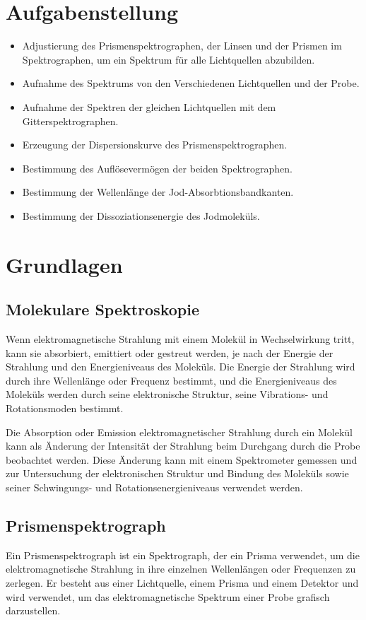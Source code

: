 \documentclass[12pt,english,ngerman]{scrartcl}
\begin{document}
\section{Aufgabenstellung\label{sec:Aufgabenstellung}}

\begin{itemize}
	\item Adjustierung des Prismenspektrographen, der Linsen und der Prismen im
	      Spektrographen, um ein Spektrum für alle Lichtquellen abzubilden.
	\item Aufnahme des Spektrums von den Verschiedenen Lichtquellen und der Probe.
	\item Aufnahme der Spektren der gleichen Lichtquellen mit dem Gitterspektrographen.
	\item Erzeugung der Dispersionskurve des Prismenspektrographen.
	\item Bestimmung des Auflösevermögen der beiden Spektrographen.
	\item Bestimmung der Wellenlänge der Jod-Absorbtionsbandkanten.
	\item Bestimmung der Dissoziationsenergie des Jodmoleküls.
\end{itemize}

\section{Grundlagen}\label{sec:Grund}

\subsection{Molekulare Spektroskopie}

Wenn elektromagnetische Strahlung mit einem Molekül in Wechselwirkung tritt,
kann sie absorbiert, emittiert oder gestreut werden, je nach der Energie der
Strahlung und den Energieniveaus des Moleküls. Die Energie der Strahlung wird
durch ihre Wellenlänge oder Frequenz bestimmt, und die Energieniveaus des
Moleküls werden durch seine elektronische Struktur, seine Vibrations- und
Rotationsmoden bestimmt.

Die Absorption oder Emission elektromagnetischer Strahlung durch ein Molekül
kann als Änderung der Intensität der Strahlung beim Durchgang durch die Probe
beobachtet werden. Diese Änderung kann mit einem Spektrometer gemessen und zur
Untersuchung der elektronischen Struktur und Bindung des Moleküls sowie seiner
Schwingungs- und Rotationsenergieniveaus verwendet werden.

\subsection{Prismenspektrograph}
Ein Prismenspektrograph ist ein Spektrograph, der ein Prisma verwendet, um die
elektromagnetische Strahlung in ihre einzelnen Wellenlängen oder Frequenzen zu
zerlegen. Er besteht aus einer Lichtquelle, einem Prisma und einem Detektor und
wird verwendet, um das elektromagnetische Spektrum einer Probe grafisch
darzustellen.
\end{document}

